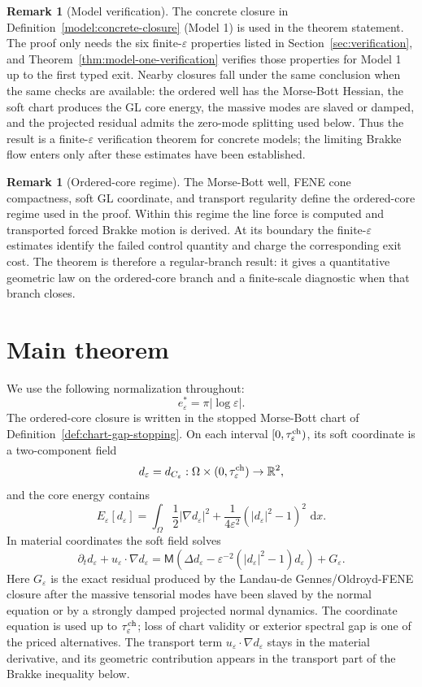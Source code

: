 \documentclass[11pt]{article}
\theoremstyle{definition}
\newtheorem{remark}[theorem]{Remark}
\newcommand{\R}{\mathbb R}
\newcommand{\dd}{\,\mathrm d}
\newcommand{\eps}{\varepsilon}
\newcommand{\estar}{e_\varepsilon^\ast}
\newcommand{\Mmob}{\mathsf M}
\begin{document}
\begin{remark}[Model verification]
The concrete closure in Definition~\ref{model:concrete-closure} (Model 1) is
used in the theorem statement.  The proof only needs the six finite-\(\eps\)
properties listed in Section~\ref{sec:verification}, and
Theorem~\ref{thm:model-one-verification} verifies those properties for Model 1
up to the first typed exit.  Nearby closures fall under the same conclusion
when the same checks are available: the ordered well has the Morse-Bott Hessian,
the soft chart produces the GL core energy, the massive modes are slaved or
damped, and the projected residual admits the zero-mode splitting used below.
Thus the result is a finite-\(\eps\) verification theorem for concrete models;
the limiting Brakke flow enters only after these estimates have been established.
\end{remark}

\begin{remark}[Ordered-core regime]
The Morse-Bott well, FENE cone compactness, soft GL coordinate, and transport
regularity define the ordered-core regime used in the proof.  Within this
regime the line force is computed and transported forced Brakke motion is
derived.  At its boundary the finite-\(\eps\) estimates identify the failed
control quantity and charge the corresponding exit cost.  The theorem is
therefore a regular-branch result: it gives a quantitative geometric law on the
ordered-core branch and a finite-scale diagnostic when that branch closes.
\end{remark}

\section{Main theorem}
\label{sec:main}

We use the following normalization throughout:
\[
        \estar=\pi|\log\eps|.
\]
The ordered-core closure is written in the stopped Morse-Bott chart of
Definition~\ref{def:chart-gap-stopping}.  On each interval
\([0,\tau_\eps^{\rm ch})\), its soft coordinate is a two-component field
\[
        d_\eps=d_{C_\eps}:\Omega\times(0,\tau_\eps^{\rm ch})\to\R^2,
\]
and the core energy contains
\[
        E_\eps[d_\eps]
        =
        \int_\Omega
        \frac12|\nabla d_\eps|^2
        +
        \frac{1}{4\eps^2}(|d_\eps|^2-1)^2\,\dd x .
\]
In material coordinates the soft field solves
\begin{equation}\label{eq:transported-gl-short}
        \partial_t d_\eps+u_\eps\cdot\nabla d_\eps
        =
        \Mmob\left(\Delta d_\eps
        -\eps^{-2}(|d_\eps|^2-1)d_\eps\right)
        +G_\eps .
\end{equation}
Here \(G_\eps\) is the exact residual produced by the
Landau-de Gennes/Oldroyd-FENE closure after the massive tensorial modes have
been slaved by the normal equation or by a strongly damped projected normal
dynamics.  The coordinate equation is used up to \(\tau_\eps^{\rm ch}\); loss of chart
validity or exterior spectral gap is one of the priced alternatives.  The
transport term \(u_\eps\cdot\nabla d_\eps\) stays in the material derivative,
and its geometric contribution appears in the transport part of the Brakke
inequality below.
\end{document}

